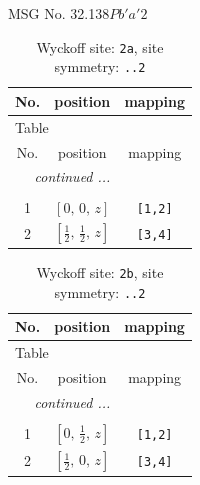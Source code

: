 \documentclass[fleqn,8pt]{jsarticle}
\begin{document}
\setcounter{MaxMatrixCols}{32}

\renewcommand{\tablename}{Table~}
\renewcommand{\figurename}{Figure~}
\begin{center}
\LARGE
MSG No. 32.138\quad$Pb'a'2$
\end{center}
\renewcommand{\arraystretch}{1.2}
\begin{longtable}{ccc}
\caption{Wyckoff site: {\tt 2a}, site symmetry: {\tt ..2}}
 \\
 \hline \hline
No. & position & mapping \\ \hline \endfirsthead

\multicolumn{2}{l}{\tablename\ \thetable{}} \\
 \hline \hline
No. & position & mapping \\ \hline \endhead

 \hline \hline
\multicolumn{2}{r}{\footnotesize\it continued ...} \\ \endfoot

 \hline \hline
\multicolumn{2}{r}{} \\ \endlastfoot

1 & $\left[ 0,\, 0,\, z \right]$ & {\tt [1,2]} \\ \hline
2 & $\left[ \frac{1}{2},\, \frac{1}{2},\, z \right]$ & {\tt [3,4]} \\
\end{longtable}
\renewcommand{\arraystretch}{1.2}
\begin{longtable}{ccc}
\caption{Wyckoff site: {\tt 2b}, site symmetry: {\tt ..2}}
 \\
 \hline \hline
No. & position & mapping \\ \hline \endfirsthead

\multicolumn{2}{l}{\tablename\ \thetable{}} \\
 \hline \hline
No. & position & mapping \\ \hline \endhead

 \hline \hline
\multicolumn{2}{r}{\footnotesize\it continued ...} \\ \endfoot

 \hline \hline
\multicolumn{2}{r}{} \\ \endlastfoot

1 & $\left[ 0,\, \frac{1}{2},\, z \right]$ & {\tt [1,2]} \\ \hline
2 & $\left[ \frac{1}{2},\, 0,\, z \right]$ & {\tt [3,4]} \\
\end{longtable}
\renewcommand{\arraystretch}{1.2}
\end{document}
